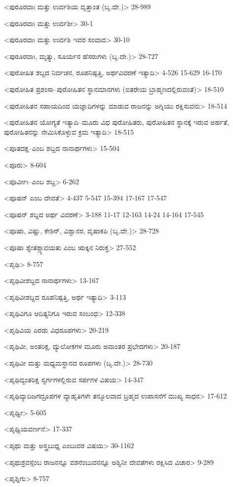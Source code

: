<ಪುರೂರವಾಃ ಮತ್ತು ಉರ್ವಶಿಯ ವೃತ್ತಾಂತ (ಬೃ.ದೇ.)>
28-989

<ಪುರೂರವಾಃ ಮತ್ತು ಉರ್ವಶೀ>
30-1

<ಪುರೂರವಾಃ ಮತ್ತು ಉರ್ವಶಿ ಇವರ ಸಂವಾದ>
30-10

<ಪುರೂರವಾಃ, ಮೃತ್ಯು, ಸೂರ್ಯನ ಹೆಸರುಗಳು (ಬೃ.ದೇ.)>
28-727

<ಪುರೋಹಿತ ಶಬ್ದದ ನಿರ್ವಚನ, ರೂಪನಿಷ್ಪತ್ತಿ, ಅರ್ಥವಿವರಣೆ ಇತ್ಯಾದಿ>
4-526
15-629
16-170

<ಪುರೋಹಿತ ಪ್ರಶಂಸಾ–ಪುರೋಹಿತನ ಸ್ಥಾನಮಾನಗಳು (ಐತರೇಯ ಬ್ರಾಹ್ಮಣದಲ್ಲಿರುವಂತೆ)>
18-510

<ಪುರೋಹಿತನ ಸಹಾಯದಿಂದ ಯಜ್ಞಾದಿಗಳನ್ನು ಮಾಡುವ ರಾಜನನ್ನು ಅಗ್ನಿಯು ರಕ್ಷಿಸುವನು>
18-514

<ಪುರೋಹಿತನ ಯೋಗ್ಯತೆ ಇತ್ಯಾದಿ–ಮೂರು ವಿಧ ಪುರೋಹಿತರು, ಪುರೋಹಿತನ ಸ್ಥಾನಕ್ಕೆ ಇರುವ ಅರ್ಹತೆ, ಪುರೋಹಿತನನ್ನು ನೇಮಿಸಿಕೊಳ್ಳುವ ಕ್ರಮ ಇತ್ಯಾದಿ>
18-515

<ಪೂತದಕ್ಷ–ಎಂಬ ಶಬ್ದದ ನಾನಾರ್ಥಗಳು>
15-504

<ಪೂರು>
8-604

<ಪೂರ್ವೀಃ–ಎಂಬ ಶಬ್ದ>
6-262

<ಪೂಷನ್‍ ಎಂಬ ದೇವತೆ>
4-437 
5-547 
15-394 
17-167
17-547

<ಪೂಷನ್‍ ಶಬ್ದದ ಅರ್ಥ ವಿವರಣೆ>
3-188 
11-17 
12-163 
14-24 
14-164
17-545

<ಪೂಷಾ, ವಿಷ್ಣು, ಕೇಶಿನ್‍, ವಿಶ್ವಾನರ, ವೃಷಾಕಪಿ (ಬೃ.ದೇ.)>
28-728

<ಪೂಷಾ ಶ್ವೇತಶ್ಚ್ಯಾವಯತು ಎಂಬ ಋಕ್ಕಿನ ನಿರುಕ್ತ>
27-552

<ಪೃಥಿ>
8-757

<ಪೃಥಿವೀಶಬ್ದದ ನಾನಾರ್ಥಗಳು>
13-167

<ಪೃಥಿವೀಶಬ್ದದ ರೂಪನಿಷ್ಪತ್ತಿ, ಅರ್ಥ ಇತ್ಯಾದಿ>
3-113

<ಪೃಥಿವಿಗೂ ಆದಿತ್ಯನಿಗೂ ಇರುವ ಸಂಬಂಧ>
12-338

<ಪೃಥಿವಿಯ ಎರಡು ವಿಧರೂಪಗಳು>
20-219

<ಪೃಥಿವೀ, ಅಂತರಿಕ್ಷ, ದ್ಯುಲೋಕಗಳ ಮೂರು ಅವಾಂತರ ಪ್ರಭೇದಗಳು>
20-187

<ಪೃಥಿವೀ ಮತ್ತು ಮಧ್ಯಮಸ್ಥಾನದ ರೂಪಗಳು (ಬೃ.ದೇ.)>
28-730

<ಪೃಥಿವ್ಯಂತರಿಕ್ಷ ಸ್ವರ್ಗಗಳಲ್ಲಿರುವ ಸರ್ಪಗಳ ವಿಷಯ>
14-347

<ಪೃಥಿವ್ಯಾದಿಜಗದ್ರೂಪಗಳ ವ್ಯಾಹೃತಿಗಳೇ ತನ್ಮೂಲವಾದ ಬ್ರಹ್ಮದ ಉಪಾಸನೆಗೆ ಮುಖ್ಯ ಸಾಧನ>
17-612

<ಪೃಥ್ವೀ>
5-605

<ಪೃಥ್ವಿಯವರ್ಣನೆ>
17-337

<ಪೃಥು ಮತ್ತು ಅಸ್ತ್ರಬುಧ್ನ ಎಂಬುವರ ವಿಷಯ>
30-1162

<ಪೃಥುಶ್ರವಸ್ಸೆಂಬ ರಾಜನನ್ನೂ ವಶನೆಂಬುವನನ್ನೂ ಅಶ್ವಿನೀ ದೇವತೆಗಳು ರಕ್ಷಿಸಿದ ವಿಚಾರ>
9-289

<ಪೃಶ್ನಿಗು>
8-757

